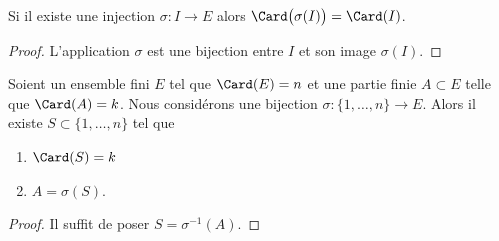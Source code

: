 \begin{proposition}	\label{PROPooTJVUooZDxMpU}
	Si il existe une injection \(\sigma \colon I\to E  \) alors \( \Card\big( \sigma(I) \big)=\Card(I)\).
\end{proposition}

\begin{proof}
	L'application \( \sigma\) est une bijection entre \( I\) et son image \( \sigma(I)\).
\end{proof}

\begin{proposition}	\label{PROPooFRKAooAnqKEh}
	Soient un ensemble fini \( E\) tel que \( \Card(E)=n\) et une partie finie \( A\subset E\) telle que \( \Card(A)=k\). Nous considérons une bijection \(\sigma \colon \{ 1,\ldots,n \}\to E  \). Alors il existe \( S\subset\{ 1,\ldots,n \}\) tel que
	\begin{enumerate}
		\item
		      \( \Card(S)=k\)
		\item
		      \( A=\sigma(S)\).
	\end{enumerate}
\end{proposition}

\begin{proof}
	Il suffit de poser \( S=\sigma^{-1}(A)\).
\end{proof}

